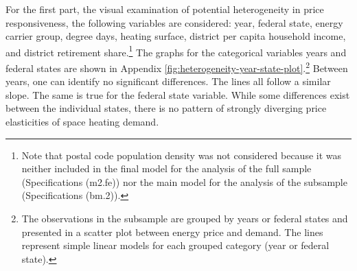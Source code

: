 \documentclass[12pt,twoside]{reedthesis}
\begin{document}
For the first part, the visual examination of potential heterogeneity in price responsiveness, the following variables are considered: year, federal state, energy carrier group, degree days, heating surface, district per capita household income, and district retirement share.\footnote{Note that postal code population density was not considered because it was neither included in the final model for the analysis of the full sample (Specifications (m2.fe)) nor the main model for the analysis of the subsample (Specifications (bm.2)).} The graphs for the categorical variables years and federal states are shown in Appendix \ref{fig:heterogeneity-year-state-plot}.\footnote{The observations in the subsample are grouped by years or federal states and presented in a scatter plot between energy price and demand. The lines represent simple linear models for each grouped category (year or federal state).} Between years, one can identify no significant differences. The lines all follow a similar slope. The same is true for the federal state variable. While some differences exist between the individual states, there is no pattern of strongly diverging price elasticities of space heating demand.
\end{document}
